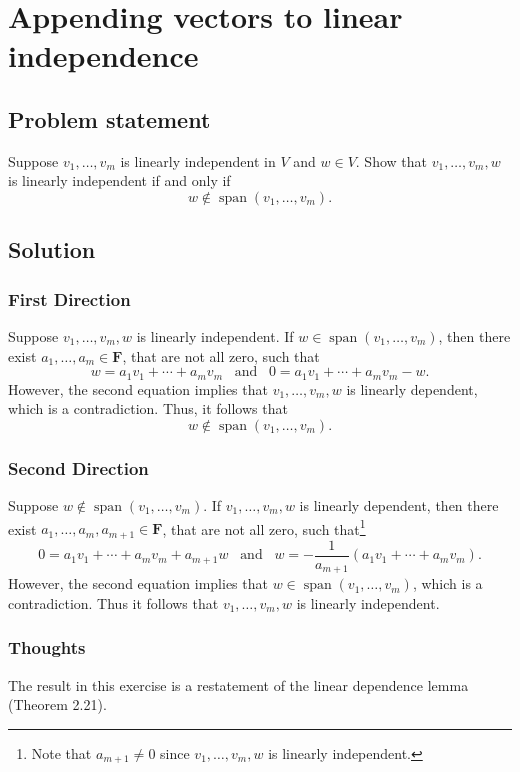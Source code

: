\documentclass{article}
\begin{document}
\clearpage

\renewcommand{\thesection}{11}
\section{Appending vectors to linear independence}
\subsection*{Problem statement}
Suppose $v_1,\ldots,v_m$ is linearly independent in $V$ and $w\in V$. 
Show that $v_1,\ldots,v_m,w$ is linearly independent if and only if 
\[w\notin \operatorname{span}(v_1,\ldots,v_m).\]

\subsection*{Solution}
\subsubsection*{First Direction}
Suppose $v_1,\ldots,v_m,w$ is linearly independent. 
If $w\in\operatorname{span}(v_1,\ldots,v_m)$, then there exist $a_1,\ldots,a_m\in\mathbf{F}$, that are not all zero, such that
\[w=a_1v_1+\cdots+a_mv_m\;\;\;\text{and}\;\;\;0=a_1v_1+\cdots+a_mv_m-w.\]
However, the second equation implies that $v_1,\ldots,v_m,w$ is linearly dependent, which is a contradiction. 
Thus, it follows that 
\[w\notin \operatorname{span}(v_1,\ldots,v_m).\]

\subsubsection*{Second Direction}
Suppose $w\notin \operatorname{span}(v_1,\ldots,v_m)$. 
If $v_1,\ldots,v_m,w$ is linearly dependent, then there exist $a_1,\ldots,a_m,a_{m+1}\in\mathbf{F}$, that are not all zero, such that\footnote{Note that $a_{m+1}\neq 0$ since $v_1,\ldots,v_m,w$ is linearly independent.}
\[0=a_1v_1+\cdots+a_mv_m+a_{m+1}w\;\;\;\text{and}\;\;\;w=-\frac{1}{a_{m+1}}(a_1v_1+\cdots+a_mv_m).\]
However, the second equation implies that $w\in \operatorname{span}(v_1,\ldots,v_m)$, which is a contradiction. 
Thus it follows that $v_1,\ldots,v_m,w$ is linearly independent.

\subsubsection*{Thoughts}
The result in this exercise is a restatement of the linear dependence lemma (Theorem 2.21).
\end{document}
